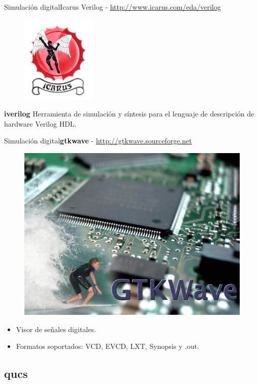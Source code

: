 \documentclass{beamer}
\begin{document}
\begin{frame}{Simulación digital}{Icarus Verilog - \url{http://www.icarus.com/eda/verilog}}
  \begin{figure}[!h]
    \centering
    \includegraphics[scale=0.6]{img/icarus.png}
  \end{figure}
  \textbf{iverilog} Herramienta de simulación y síntesis para el lenguaje de descripción de hardware Verilog HDL.
\end{frame}

\begin{frame}{Simulación digital}{\textbf{gtkwave} - \url{http://gtkwave.sourceforge.net}}
  \begin{figure}[!h]
    \centering
    \includegraphics[scale=0.25]{img/gtkwave.png}
  \end{figure}
  \begin{itemize}
  \item Visor de señales digitales.
  \item Formatos soportados: VCD, EVCD,	LXT, Synopsis y .out.
  \end{itemize}
\end{frame}

\subsection[qucs - \url{http://qucs.sourceforge.net}]{qucs}
\end{document}
